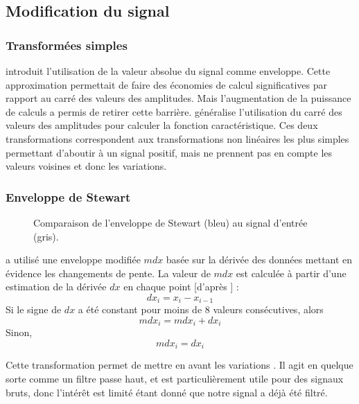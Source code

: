 \documentclass[a4paper, 11pt]{article} %
\begin{document}
\subsection{Modification du signal}

\subsubsection{Transformées simples}

\cite{vanderkulk1965} introduit l'utilisation de la valeur absolue du signal comme enveloppe. Cette approximation permettait de faire des économies de calcul significatives par rapport au carré des valeurs des amplitudes. Mais l'augmentation de la puissance de calculs a permis de retirer cette barrière. \cite{allen1978} généralise l'utilisation du carré des valeurs des amplitudes pour calculer la fonction caractéristique. Ces deux transformations correspondent aux transformations non linéaires les plus simples permettant d'aboutir à un signal positif, mais ne prennent pas en compte les valeurs voisines et donc les variations.

\subsubsection{Enveloppe de Stewart}

\begin{figure}[!ht]
    \centering
    \scalebox{.9}{}
    \caption{Comparaison de l'enveloppe de Stewart (bleu) au signal d'entrée (gris).}
    \label{fig:env-stewart}
\end{figure}

\cite{stewart1977} a utilisé une enveloppe modifiée $mdx$ basée sur la dérivée des données mettant en évidence les changements de pente. La valeur de $mdx$ est calculée à partir d'une estimation de la dérivée $dx$ en chaque point [d'après \cite{wither1998}] :
\begin{equation}
   dx_i=x_i-x_{i-1}
\end{equation}
Si le signe de $dx$ a été constant pour moins de 8 valeurs consécutives, alors 
\begin{equation}
   mdx_i = mdx_i + dx_i
\end{equation}
Sinon,
\begin{equation}
   mdx_i = dx_i
\end{equation}

Cette transformation permet de mettre en avant les variations . Il agit en quelque sorte comme un filtre passe haut, et est particulièrement utile pour des signaux bruts, donc l'intérêt est limité étant donné que notre signal a déjà été filtré.
\end{document}
